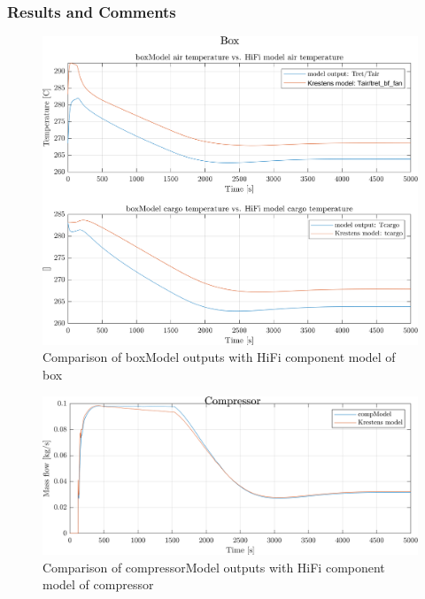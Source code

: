 \clearpage
\subsubsection*{Results and Comments}
\begin{figure}[h]
	\centering
	\includegraphics[width=1\textwidth]{Graphics/comp_test_box.png}
	\caption{Comparison of boxModel outputs with HiFi component model of box}
	\label{fig:component_test_box}
\end{figure}
\begin{figure}[h]
	\centering
	\includegraphics[width=1\textwidth]{Graphics/comp_test_com.png}
	\caption{Comparison of compressorModel outputs with HiFi component model of compressor}
	\label{fig:component_test_com}
\end{figure}
